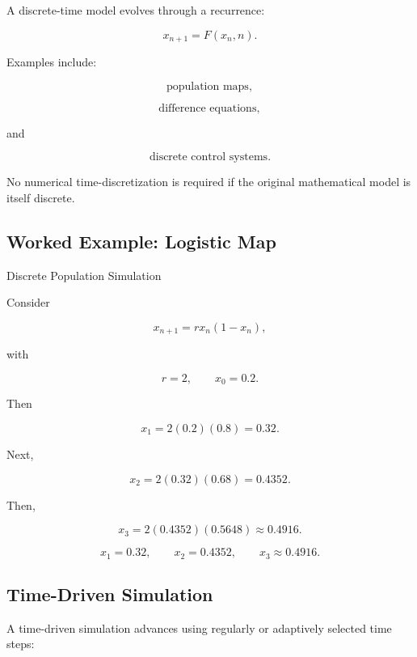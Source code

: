 A discrete-time model evolves through a recurrence:

\[
\boxed{
x_{n+1}
=
F(x_n,n).
}
\]

Examples include:

\[
\boxed{
\text{population maps},
}
\]

\[
\boxed{
\text{difference equations},
}
\]

and

\[
\boxed{
\text{discrete control systems}.
}
\]

No numerical time-discretization is required if the original mathematical
model is itself discrete.

\subsection{Worked Example: Logistic Map}
\label{subsec:worked-logistic-map-simulation}

\begin{workedexamplebox}{Discrete Population Simulation}

Consider

\[
x_{n+1}
=
rx_n(1-x_n),
\]

with

\[
r=2,
\qquad
x_0=0.2.
\]

Then

\[
x_1
=
2(0.2)(0.8)
=
0.32.
\]

Next,

\[
x_2
=
2(0.32)(0.68)
=
0.4352.
\]

Then,

\[
x_3
=
2(0.4352)(0.5648)
\approx
0.4916.
\]

\begin{answerbox}
\[
\boxed{
x_1=0.32,
\qquad
x_2=0.4352,
\qquad
x_3\approx0.4916.
}
\]
\end{answerbox}

\end{workedexamplebox}

\subsection{Time-Driven Simulation}
\label{subsec:time-driven-simulation}

A time-driven simulation advances using regularly or adaptively selected
time steps:


